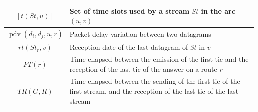 \documentclass[10pt]{article}
\DeclareMathOperator{\pdv}{pdv}
\begin{document}
\begin{center}
\begin{tabularx}{0.8\textwidth}{|c|X|}
    \hline
    $ [t(St,u)]$ & Set of time slots used by a stream $St$ in the arc $(u,v)$ \\
    \hline
    $\pdv(d_i,d_j,u,r)$ & Packet delay variation between two datagrams \\
    \hline
    $rt(St_r,v)$ & Reception date of the last datagram of $St$ in $v$ \\
    \hline 
    $PT(r)$ & Time ellapsed between the emission of the first tic and the reception of the last tic of the answer on a route $r$ \\
    \hline
    $TR(G,R)$ &  Time ellapsed between the sending of the first tic of the first stream, and the reception of the last tic of the last stream \\
    \hline
      \end{tabularx}
      \end{center}
\end{document}
